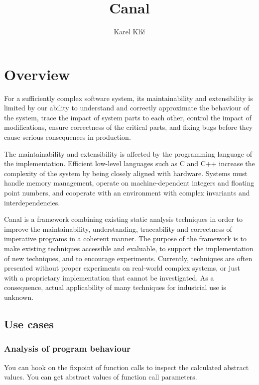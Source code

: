 \documentclass[a4paper]{book}
\title{Canal}
\author{Karel Klíč}
\begin{document}
\maketitle

\tableofcontents

\cleardoublepage

\chapter{Overview}

For a sufficiently complex software system, its maintainability and
extensibility is limited by our ability to understand and correctly
approximate the behaviour of the system, trace the impact of system
parts to each other, control the impact of modifications, ensure
correctness of the critical parts, and fixing bugs before they cause
serious consequences in production.

The maintainability and extensibility is affected by the programming
language of the implementation.  Efficient low-level languages such as
C and C++ increase the complexity of the system by being closely
aligned with hardware. Systems must handle memory management, operate
on machine-dependent integers and floating point numbers, and
cooperate with an environment with complex invariants and
interdependencies.

Canal is a framework combining existing static analysis techniques in
order to improve the maintainability, understanding, traceability and
correctness of imperative programs in a coherent manner.  The purpose
of the framework is to make existing techniques accessible and
evaluable, to support the implementation of new techniques, and to
encourage experiments.  Currently, techniques are often presented
without proper experiments on real-world complex systems, or just with
a proprietary implementation that cannot be investigated.  As a
consequence, actual applicability of many techniques for industrial
use is unknown.

\section{Use cases}
\subsection{Analysis of program behaviour}
You can hook on the fixpoint of function calls to inspect the
calculated abstract values.  You can get abstract values of function
call parameters.
\end{document}
